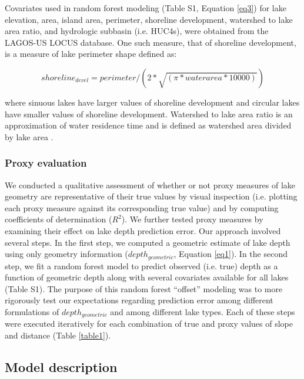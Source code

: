 \documentclass[draft]{agujournal2019}
\begin{document}
Covariates used in random forest modeling (Table S1, Equation \ref{eq3}) for lake elevation, area, island area, perimeter, shoreline development, watershed to lake area ratio, and hydrologic subbasin (i.e. HUC4s), were obtained from the LAGOS-US LOCUS database. One such measure, that of shoreline development, is a measure of lake perimeter shape defined as:

\begin{linenomath*}
      \begin{equation}
            shoreline_{devel} = perimeter / (2 * \sqrt{(\pi * waterarea * 10000)}) \label{eq2}
      \end{equation}
      \end{linenomath*}

\noindent
where sinuous lakes have larger values of shoreline development and circular lakes have smaller values of shoreline development. Watershed to lake area ratio is an approximation of water residence time and is defined as watershed area divided by lake area \cite{timmsGeomorphologyLakeBasins2009}.

\subsubsection{Proxy evaluation}
\noindent
We conducted a qualitative assessment of whether or not proxy measures of lake geometry are representative of their true values by visual inspection (i.e. plotting each proxy measure against its corresponding true value) and by computing coefficients of determination ($R^2$). We further tested proxy measures by examining their effect on lake depth prediction error. Our approach involved several steps. In the first step, we computed a geometric estimate of lake depth using only geometry information ($depth_{geometric}$, Equation \ref{eq1}). In the second step, we fit a random forest model to predict observed (i.e. true) depth as a function of geometric depth along with several covariates available for all lakes (Table S1). The purpose of this random forest “offset” modeling was to more rigorously test our expectations regarding prediction error among different formulations of $depth_{geometric}$ and among different lake types. Each of these steps were executed iteratively for each combination of true and proxy values of slope and distance (Table \ref{table1}).

\subsection{Model description}
\end{document}
